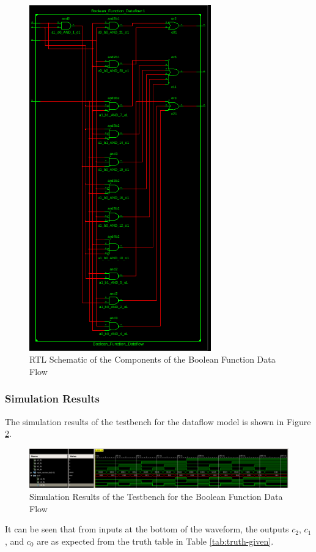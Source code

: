 \documentclass[table]{article}
\begin{document}
\begin{figure}[H]
    \centering
    \includegraphics[width=0.7\textwidth]{img/rtl_df_2.png}
    \caption{RTL Schematic of the Components of the Boolean Function Data Flow}
    \label{fig:rtl-schematic-components-dataflow}

\end{figure}

\newpage

\subsubsection*{Simulation Results}

The simulation results of the testbench for the dataflow model is shown in Figure \ref{fig:simulation-results-dataflow}.

\begin{figure}[H]
    \centering
    \includegraphics[width=1\textwidth]{img/dataflow_sim.png}
    \caption{Simulation Results of the Testbench for the Boolean Function Data Flow}
    \label{fig:simulation-results-dataflow}

\end{figure}

It can be seen that from inputs at the bottom of the waveform, the outputs \(c_2\), \(c_1\), and \(c_0\) are as expected from the truth table in Table \ref{tab:truth-given}.
\end{document}
